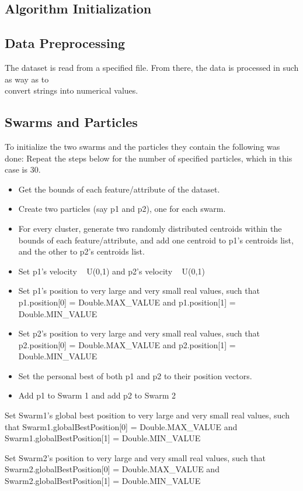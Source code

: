 \begin{flushleft}
    \subsection{Algorithm Initialization}
        \subsection{Data Preprocessing}
        The dataset is read from a specified file. From there, the data is processed in such as way as to \\
        convert strings into numerical values.
        
        \subsection{Swarms and Particles}
            To initialize the two swarms and the particles they contain the following was done:
            Repeat the steps below for the number of specified particles, which in this case is 30.
            \begin{itemize}
                \item Get the bounds of each feature/attribute of the dataset.
                \item Create two particles (say p1 and p2), one for each swarm.
                \item For every cluster, generate two randomly distributed centroids within the bounds of each 
                feature/attribute, and add one centroid to p1's centroids list, and the other to p2's centroids list.
                \item Set p1's velocity ~ U(0,1) and p2's velocity ~ U(0,1)
                \item Set p1's position to very large and very small real values, such that 
                p1.position[0] = Double.MAX_VALUE and p1.position[1] = Double.MIN_VALUE
                \item Set p2's position to very large and very small real values, such that 
                p2.position[0] = Double.MAX_VALUE and p2.position[1] = Double.MIN_VALUE
                \item Set the personal best of both p1 and p2 to their position vectors.
                \item Add p1 to Swarm 1 and add p2 to Swarm 2
            \end{itemize}
            \item Set Swarm1's global best position to very large and very small real values, such that 
                Swarm1.globalBestPosition[0] = Double.MAX_VALUE and Swarm1.globalBestPosition[1] = Double.MIN_VALUE
            \item Set Swarm2's position to very large and very small real values, such that 
                Swarm2.globalBestPosition[0] = Double.MAX_VALUE and Swarm2.globalBestPosition[1] = Double.MIN_VALUE
    

\end{flushleft}
